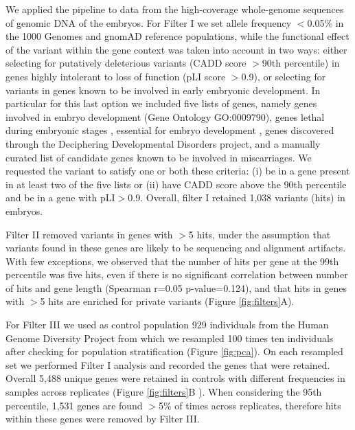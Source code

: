 We applied the \gp pipeline to data from the high-coverage whole-genome sequences of genomic DNA of the embryos. For Filter I we set allele frequency $<$0.05\% in the 1000 Genomes\cite{1000genome2015global} and gnomAD\cite{karczewski2020mutational} reference populations, while the functional effect of the variant within the gene context was taken into account in two ways: either selecting for putatively deleterious variants (CADD score $>$90th percentile) in genes highly intolerant to loss of function (pLI score $>$0.9), or selecting for variants in genes known to be involved in early embryonic development. In particular for this last option we included five lists of genes, namely genes involved in embryo development (Gene Ontology GO:0009790), genes lethal during embryonic stages \cite{dawes2019gene}, essential for embryo development \cite{dawes2019gene}, genes discovered through the Deciphering Developmental Disorders project\cite{study2015large}, and a manually curated list of candidate genes known to be involved in miscarriages. We requested the variant to satisfy one or both these criteria: (i) be in a gene present in at least two of the five lists or (ii) have CADD score above the 90th percentile and be in a gene with pLI$>$0.9. Overall, filter I retained 1,038 variants (hits) in embryos.   

Filter II removed variants in genes with $>$5 hits, under the assumption that variants found in these genes are likely to be sequencing and alignment artifacts. With few exceptions, we observed that the number of hits per gene at the 99th percentile was five hits, even if there is no significant correlation between number of hits and gene length (Spearman r=0.05 p-value=0.124), and  that hits in genes with $>$5 hits are enriched for private variants (Figure \ref{fig:filters}A).  

For Filter III we used as control population 929 individuals from the Human Genome Diversity Project\cite{bergstrom2020insights} from which we resampled 100 times ten individuals after checking for population stratification (Figure \ref{fig:pca}). On each resampled set we performed Filter I analysis and recorded the genes that were retained. Overall 5,488 unique genes were retained in controls with different frequencies in samples across replicates (Figure \ref{fig:filters}B ). When considering the 95th percentile, 1,531 genes are found $>$5\% of times across replicates, therefore hits within these genes were removed by Filter III. %

